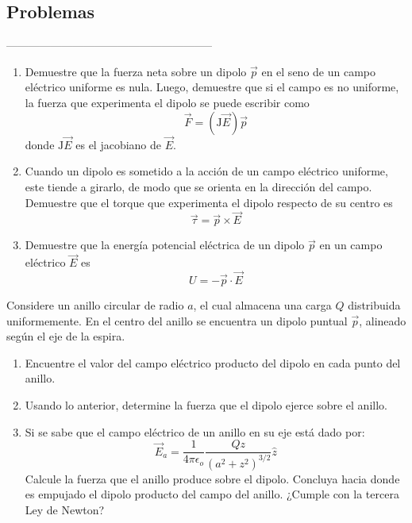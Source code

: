 \subsection{Problemas}
--------------------------------------------------------
\\

\np

\begin{enumerate}[label=\alph*)]
    \item Demuestre que la fuerza neta sobre un dipolo $\Vec{p}$ en el seno de un campo eléctrico uniforme es nula. Luego, demuestre que si el campo es no uniforme, la fuerza que experimenta el dipolo se puede escribir como
    \[\Vec{F} = (\mathrm{J}\Vec{E})\Vec{p}\]
    donde $\mathrm{J}\Vec{E}$ es el jacobiano de $\Vec{E}$.
    \item Cuando un dipolo es sometido a la acción de un campo eléctrico uniforme, este tiende a girarlo, de modo que se orienta en la dirección del campo. Demuestre que el torque que experimenta el dipolo respecto de su centro es
    \[\Vec{\tau} = \Vec{p}\times \Vec{E}\]
    \item Demuestre que la energía potencial eléctrica de un dipolo $\Vec{p}$ en un campo eléctrico $\Vec{E}$ es
    \[U=-\Vec{p}\cdot\Vec{E}\]
\end{enumerate}

\np
 Considere un anillo circular de radio $a$, el cual almacena una carga $Q$ distribuida uniformemente. En el centro del anillo se encuentra un dipolo puntual $\Vec{p}$, alineado según el eje de la espira.
 
\begin{enumerate}[label=\alph*)]
    \item Encuentre el valor del campo eléctrico producto del dipolo en cada punto del anillo.
    \item Usando lo anterior, determine la fuerza que el dipolo ejerce sobre el anillo.
    \item Si se sabe que el campo eléctrico de un anillo en su eje está dado por:
    \[\Vec{E}_a = \frac{1}{4\pi\epsilon_o}
    \frac{Qz}{(a^2+z^2)^{3/2}}\hat{z}\]
    Calcule la fuerza que el anillo produce sobre el dipolo. Concluya hacia donde es empujado el dipolo producto del campo del anillo. ¿Cumple con la tercera Ley de Newton?
\end{enumerate}

\bigbreak

\np

